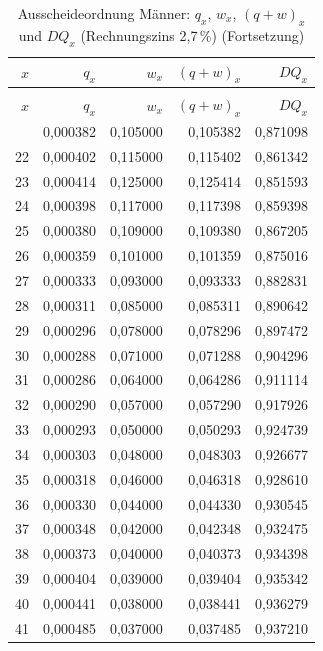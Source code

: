 \begin{small}
\begin{longtable}{rrrrr}
\caption{Ausscheideordnung Männer: $q_x$, $w_x$, $(q+w)_x$ und $DQ_x$ (Rechnungszins 2,7\,\%)}\label{tab:aoM}\\
\toprule
$x$ & $q_x$ & $w_x$ & $(q+w)_x$ & $DQ_x$ \\
\midrule
\endfirsthead
\caption[]{Ausscheideordnung Männer: $q_x$, $w_x$, $(q+w)_x$ und $DQ_x$ (Rechnungszins 2,7\,\%) (Fortsetzung)}\\
\toprule
$x$ & $q_x$ & $w_x$ & $(q+w)_x$ & $DQ_x$ \\
\midrule
\endhead
\bottomrule
\endfoot
21 & 0,000382 & 0,105000 & 0,105382 & 0,871098 \\
22 & 0,000402 & 0,115000 & 0,115402 & 0,861342 \\
23 & 0,000414 & 0,125000 & 0,125414 & 0,851593 \\
24 & 0,000398 & 0,117000 & 0,117398 & 0,859398 \\
25 & 0,000380 & 0,109000 & 0,109380 & 0,867205 \\
26 & 0,000359 & 0,101000 & 0,101359 & 0,875016 \\
27 & 0,000333 & 0,093000 & 0,093333 & 0,882831 \\
28 & 0,000311 & 0,085000 & 0,085311 & 0,890642 \\
29 & 0,000296 & 0,078000 & 0,078296 & 0,897472 \\
30 & 0,000288 & 0,071000 & 0,071288 & 0,904296 \\
31 & 0,000286 & 0,064000 & 0,064286 & 0,911114 \\
32 & 0,000290 & 0,057000 & 0,057290 & 0,917926 \\
33 & 0,000293 & 0,050000 & 0,050293 & 0,924739 \\
34 & 0,000303 & 0,048000 & 0,048303 & 0,926677 \\
35 & 0,000318 & 0,046000 & 0,046318 & 0,928610 \\
36 & 0,000330 & 0,044000 & 0,044330 & 0,930545 \\
37 & 0,000348 & 0,042000 & 0,042348 & 0,932475 \\
38 & 0,000373 & 0,040000 & 0,040373 & 0,934398 \\
39 & 0,000404 & 0,039000 & 0,039404 & 0,935342 \\
40 & 0,000441 & 0,038000 & 0,038441 & 0,936279 \\
41 & 0,000485 & 0,037000 & 0,037485 & 0,937210 \\

\end{longtable}
\end{small}
